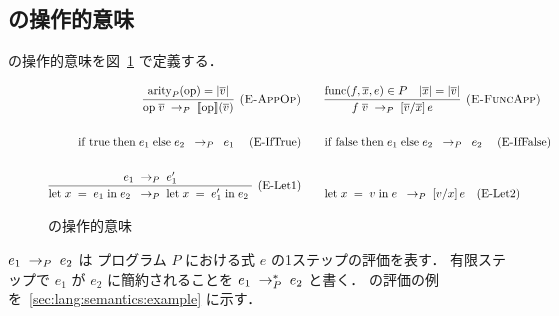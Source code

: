 \subsection{\Yil の操作的意味}

\par \Yil の操作的意味を図~\ref{fig:lang:semantics} で定義する．

\begin{figure}[H]
  \begin{align*}
    \infer[\ERuleAppOp] {
      \Reduce{P}{\App{\mathrm{op}}{\seq{v}}}{\sem{\mathrm{op}}\paren{\seq{v}}}
    } {
      \arity{P}{\mathrm{op}} = |\seq{v}|
    } & \quad\quad
    \infer[\ERuleAppFunc] {
      \Reduce{P}{\App{f}{\seq{v}}}{\subst{\seq{v}}{\seq{x}}{e}}
    } {
      \Func{f}{\seq{x}}{e} \in P
      & |\seq{x}| = |\seq{v}|
    } \\\\
    \Reduce{P}{\If{\; \true \;}{\; e_1 \;}{\; e_2 \;}}{\; e_1 \;} \quad \ERuleIfTrue & \quad\quad
    \Reduce{P}{\If{\; \false \;}{\; e_1 \;}{\; e_2 \;}}{\; e_2 \;} \quad \ERuleIfFalse \\\\
    \infer[\ERuleLetCtx] {
      \Reduce{P}{\Let{\; x \;}{\; e_1 \;}{\; e_2 \;}}{\Let{\; x \;}{\; e'_1 \;}{\; e_2 \;}}
    } {
      \Reduce{P}{e_1}{e'_1}
    } & \quad\quad
    \Reduce{P}{\Let{\; x \;}{\; v \;}{\; e \;}}{\subst{v}{x}{e}} \quad \ERuleLetSubst
  \end{align*}

  \caption{\Yil の操作的意味}
  \label{fig:lang:semantics}
\end{figure}

\par $\Reduce{P}{e_1}{e_2}$ は プログラム $P$ における式 $e$ の1ステップの評価を表す．
有限ステップで $e_1$ が $e_2$ に簡約されることを $\MultiReduce{P}{e_1}{e_2}$ と書く．
\Yil の評価の例を~\ref{sec:lang:semantics:example} に示す．

